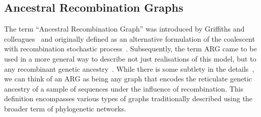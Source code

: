 \documentclass{article}
\begin{document}


\subsection{Ancestral Recombination Graphs}
\label{sec:args}
The term ``Ancestral Recombination Graph'' was introduced by
Griffiths and colleagues~\citep{Griffiths1991-two,Griffiths1998-ancestral}
and originally defined as an alternative formulation of the coalescent
with recombination stochastic process~\citep{Hudson1983-properties}.
Subsequently, the term ARG came to be used in a more general way to
describe not just realisations of this model, but to any
recombinant genetic ancestry~\citep{Minichiello2006-mapping,Zhang2023-lf}.
While there is some subtlety in the details~\citep{Wong2023-efficient},
we can think of an ARG as being any graph that encodes the
reticulate genetic ancestry of a sample of sequences under
the influence of recombination.
This definition encompasses various types of graphs traditionally
described using the broader term of phylogenetic networks.
\end{document}
